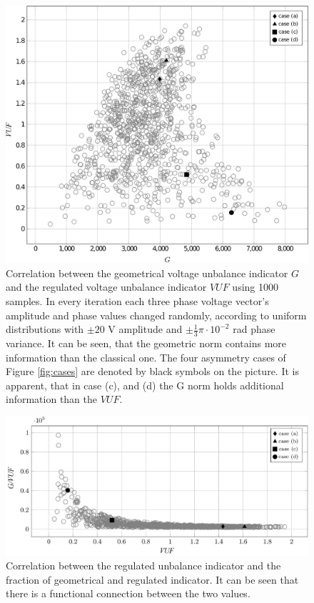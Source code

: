             \begin{figure}[!ht]
           \centering
           \includegraphics[width=\textwidth,scale=0.95]{Unblance_EPS_Pics/EPS_images/scatter.png}
           \caption{Correlation between the geometrical voltage unbalance indicator $G$ and the regulated voltage unbalance indicator $VUF$ using 1000 samples. In every iteration each three phase voltage vector's amplitude and phase values changed randomly, according to uniform distributions with $\pm20$ V amplitude and $\pm\frac{1}{3}\pi\cdot10^{-2}$ rad phase variance. It can be seen, that the geometric norm contains more information than the classical one. The  four asymmetry cases of Figure \ref{fig:cases} are denoted by black symbols on the picture. It is apparent, that in case (c), and (d) the G norm holds additional information than the $VUF$.}
           \label{fig:correlation}
            \end{figure}

            \begin{figure}[!ht]
           \centering
           \includegraphics[width=\textwidth,scale=0.95]{Unblance_EPS_Pics/EPS_images/side_scatter.png}
           \caption{ Correlation between the regulated unbalance indicator and the fraction of geometrical and regulated indicator. It can be seen that there is a functional connection between the two values.}
           \label{fig:side_correlation}
            \end{figure}


